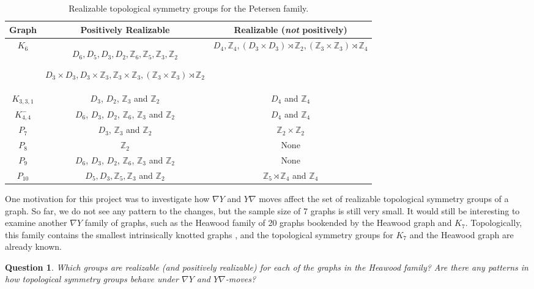 \documentclass[11]{amsart}
\def\Z{\mathbb{Z}}
\newcommand{\semi}{{\rtimes}}
\newtheorem{question}{Question}
\theoremstyle{definition}
\theoremstyle{remark}
\begin{document}
\begin{table}[htbp]
\begin{center}
\begin{tabular}{|c|c|c|}
\hline
{\bf Graph} & {\bf Positively Realizable} & {\bf Realizable ({\em not} positively)} \\ \hline
$K_6$ & \parbox{2.5in}{\rule{0in}{.15in} $D_6, D_5, D_3, D_2, \Z_6, \Z_5, \Z_3, \Z_2$ \\ \rule[-.08in]{0in}{.1in}$D_3 \times D_3, D_3 \times \Z_3, \Z_3 \times \Z_3, (\Z_3 \times \Z_3) \semi \Z_2$} & $D_4, \Z_4, (D_3 \times D_3) \semi \Z_2, (\Z_3 \times \Z_3) \semi \Z_4$ \\ \hline
\rule[-.07in]{0in}{.2in} $K_{3,3,1}$ & $D_3$, $D_2$, $\mathbb{Z}_3$ and $\mathbb{Z}_2$ & $D_4$ and $\Z_4$ \\ \hline
\rule[-.07in]{0in}{.2in}$K_{4,4}^-$ & $D_6$, $D_3$, $D_2$, $\mathbb{Z}_6$, $\Z_3$ and $\mathbb{Z}_2$ & $D_4$ and $\Z_4$ \\ \hline
\rule[-.07in]{0in}{.2in}$P_7$ & $D_3$, $\Z_3$ and $\Z_2$ & $\Z_2 \times \Z_2$ \\ \hline
\rule[-.07in]{0in}{.2in}$P_8$ & $\Z_2$ & None \\ \hline
\rule[-.07in]{0in}{.2in}$P_9$ & $D_6$, $D_3$, $D_2$, $\Z_6$, $\Z_3$ and $\Z_2$ & None \\ \hline
\rule[-.07in]{0in}{.2in}$P_{10}$ & $D_5, D_3, \Z_5, \Z_3$ and $\Z_2$ & $\Z_5 \semi \Z_4$ and $\Z_4$ \\ \hline
\end{tabular}
\end{center}
\caption{Realizable topological symmetry groups for the Petersen family.}
\label{Ta:TSG}
\end{table} 

One motivation for this project was to investigate how $\nabla Y$ and $Y\nabla$ moves affect the set of realizable topological symmetry groups of a graph. So far, we do not see any pattern to the changes, but the sample size of 7 graphs is still very small. It would still be interesting to examine another $\nabla Y$ family of graphs, such as the Heawood family of 20 graphs bookended by the Heawood graph and $K_7$. Topologically, this family contains the smallest intrinsically knotted graphs \cite{lklo}, and the topological symmetry groups for $K_7$ \cite{fmn3} and the Heawood graph \cite{flw} are already known.

\begin{question}
Which groups are realizable (and positively realizable) for each of the graphs in the Heawood family? Are there any patterns in how topological symmetry groups behave under $\nabla Y$ and $Y \nabla$-moves?
\end{question}
\end{document}
